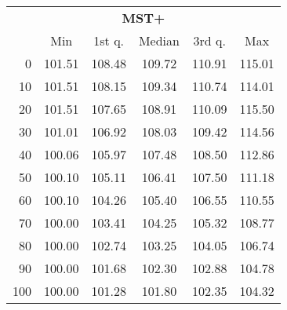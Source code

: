 \begin{tabular}{r|ccccc}
  \multicolumn{6}{c}{{\bf MST+}} \\
  & Min & 1st q. & Median & 3rd q. & Max \\ \hline\hline
  0 & 101.51 & 108.48 & 109.72 & 110.91 & 115.01
\\ 10 & 101.51 & 108.15 & 109.34 & 110.74 & 114.01
\\ 20 & 101.51 & 107.65 & 108.91 & 110.09 & 115.50
\\ 30 & 101.01 & 106.92 & 108.03 & 109.42 & 114.56
\\ 40 & 100.06 & 105.97 & 107.48 & 108.50 & 112.86
\\ 50 & 100.10 & 105.11 & 106.41 & 107.50 & 111.18
\\ 60 & 100.10 & 104.26 & 105.40 & 106.55 & 110.55
\\ 70 & 100.00 & 103.41 & 104.25 & 105.32 & 108.77
\\ 80 & 100.00 & 102.74 & 103.25 & 104.05 & 106.74
\\ 90 & 100.00 & 101.68 & 102.30 & 102.88 & 104.78
\\ 100 & 100.00 & 101.28 & 101.80 & 102.35 & 104.32
\end{tabular}
